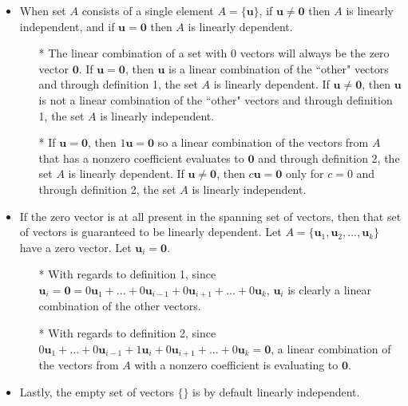 \documentclass{article}
\begin{document}
\begin{itemize}
\item When set \(A\) consists of a single element \(A = \{\mathbf{u}\}\), if \(\mathbf{u} \neq \mathbf{0}\) then \(A\) is linearly independent, and if \(\mathbf{u} = \mathbf{0}\) then \(A\) is linearly dependent.  
\begin{itemize}
\item[*] The linear combination of a set with \(0\) vectors will always be the zero vector \(\mathbf{0}\). If \(\mathbf{u} = \mathbf{0}\), then \(\mathbf{u}\) is a linear combination of the ``other" vectors and through definition 1, the set \(A\) is linearly dependent. If \(\mathbf{u} \neq \mathbf{0}\), then \(\mathbf{u}\) is not a linear combination of the ``other" vectors and through definition 1, the set \(A\) is linearly independent.  
\item[*] If \(\mathbf{u} = \mathbf{0}\), then \(1\mathbf{u} = \mathbf{0}\) so a linear combination of the vectors from \(A\) that has a nonzero coefficient evaluates to \(\mathbf{0}\) and through definition 2, the set \(A\) is linearly dependent. If \(\mathbf{u} \neq \mathbf{0}\), then \(c\mathbf{u} = \mathbf{0}\) only for \(c = 0\) and through definition 2, the set \(A\) is linearly independent.
\end{itemize} 
\item If the zero vector is at all present in the spanning set of vectors, then that set of vectors is guaranteed to be linearly dependent. Let \(A = \{\mathbf{u}_1, \mathbf{u}_2, ..., \mathbf{u}_k\}\) have a zero vector. Let \(\mathbf{u}_i = \mathbf{0}\). 
\begin{itemize}
\item[*] With regards to definition 1, since \(\mathbf{u}_i = \mathbf{0} = 0\mathbf{u}_1 + ... + 0\mathbf{u}_{i-1} + 0\mathbf{u}_{i+1} + ... + 0\mathbf{u}_k\), \(\mathbf{u}_i\) is clearly a linear combination of the other vectors. 
\item[*] With regards to definition 2, since \(0\mathbf{u}_1 + ... + 0\mathbf{u}_{i-1} + 1\mathbf{u}_i + 0\mathbf{u}_{i+1} + ... + 0\mathbf{u}_k = \mathbf{0}\), a linear combination of the vectors from \(A\) with a nonzero coefficient is evaluating to \(\mathbf{0}\). 
\end{itemize}
\item Lastly, the empty set of vectors \(\{\}\) is by default linearly independent.
\end{itemize}
\end{document}
